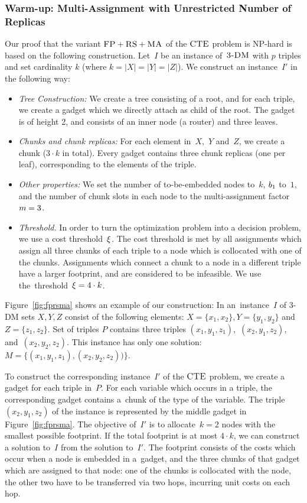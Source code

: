 \subsubsection{Warm-up: Multi-Assignment with Unrestricted Number of Replicas}

Our proof that the variant $\textsc{FP}+\textsc{RS}+\textsc{MA}$ of the $\textsc{CTE}$ problem is NP-hard is based on the following construction.
Let~$I$ be an instance of~$\textsc{3-DM}$ with $p$ triples and set cardinality $k$ (where $k = |X| = |Y| = |Z|$).
We construct an instance~$I'$ in the following way:
\begin{itemize}
\item \emph{Tree Construction:} We create a tree consisting of a root,
and for each triple, we create a gadget which we directly attach as
child of the root. The gadget is of height 2,
and consists of an inner node (a router) and three leaves.
\item \emph{Chunks and chunk replicas:} For each element in~$X$,~$Y$ and~$Z$,
 we create a chunk
($3 \cdot k$ in total). Every gadget contains three chunk replicas (one per leaf),
corresponding to the elements of the triple.
\item \emph{Other properties:} We set the number of to-be-embedded nodes to~$k$,
$b_1$ to~$1$, and the number of chunk slots in each node to the multi-assignment factor
$m=3$.
\item \emph{Threshold.} In order to turn the optimization problem into a decision problem, we use
a cost threshold~$\xi$. The cost threshold is met by all
assignments which assign all three chunks of each triple to a
node which is collocated with one of the chunks. Assignments which connect a
chunk to a node in a different triple have a larger footprint, and are
considered to be infeasible.
We use the~threshold~$\xi= 4\cdot k$.

\end{itemize}

 Figure~\ref{fig:fprsma} shows an example of our construction: In an~instance~$I$
of 3-DM sets $X, Y, Z$ consist of the following elements: $X = \{ x_1, x_2 \}, Y = \{ y_1, y_2 \}$ and $Z = \{ z_1, z_2 \}$.
Set of triples $P$ contains three triples
$(x_1, y_1,
z_1)$,~$(x_2, y_1, z_2)$, and~$(x_2, y_2, z_2)$. This instance has only one solution:~$M =
\{(x_1,y_1,z_1),(x_2,y_2,z_2))\}$.

To construct the corresponding instance~$I'$ of the $\textsc{CTE}$ problem, we
create a gadget for each triple in~$P$. For each variable which occurs in a
triple, the corresponding gadget contains a~chunk of the
type of the variable. The triple
$(x_2, y_1, z_2)$ of the instance is represented by the middle gadget in
Figure~\ref{fig:fprsma}. The objective of~$I'$ is to allocate~$k=2$ nodes
with the smallest possible footprint. If the total footprint is at most $4\cdot k$, we can construct a solution to~$I$ from the solution to~$I'$.
The footprint consists of the costs which occur when a node is embedded in a~gadget, and the three chunks of that gadget which are assigned to that node: one of
the chunks is collocated with the node, the other two have to be transferred
via two hops, incurring unit costs on each hop.

